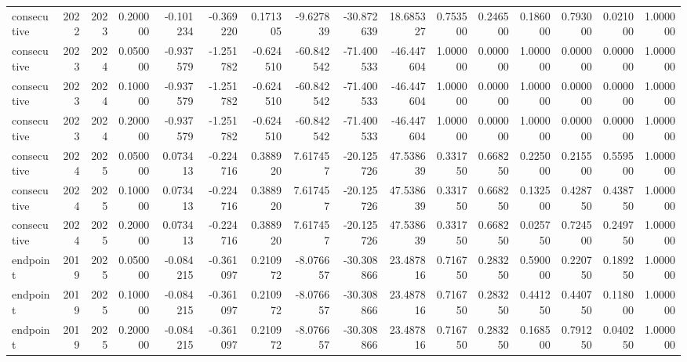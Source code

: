 \begin{tabular}{lrrrrrrrrrrrrrrr}
consecutive & 2022 & 2023 & 0.200000 & -0.101234 & -0.369220 & 0.171305 & -9.627839 & -30.872639 & 18.685327 & 0.753500 & 0.246500 & 0.186000 & 0.793000 & 0.021000 & 1.000000 \\
consecutive & 2023 & 2024 & 0.050000 & -0.937579 & -1.251782 & -0.624510 & -60.842542 & -71.400533 & -46.447604 & 1.000000 & 0.000000 & 1.000000 & 0.000000 & 0.000000 & 1.000000 \\
consecutive & 2023 & 2024 & 0.100000 & -0.937579 & -1.251782 & -0.624510 & -60.842542 & -71.400533 & -46.447604 & 1.000000 & 0.000000 & 1.000000 & 0.000000 & 0.000000 & 1.000000 \\
consecutive & 2023 & 2024 & 0.200000 & -0.937579 & -1.251782 & -0.624510 & -60.842542 & -71.400533 & -46.447604 & 1.000000 & 0.000000 & 1.000000 & 0.000000 & 0.000000 & 1.000000 \\
consecutive & 2024 & 2025 & 0.050000 & 0.073413 & -0.224716 & 0.388920 & 7.617457 & -20.125726 & 47.538639 & 0.331750 & 0.668250 & 0.225000 & 0.215500 & 0.559500 & 1.000000 \\
consecutive & 2024 & 2025 & 0.100000 & 0.073413 & -0.224716 & 0.388920 & 7.617457 & -20.125726 & 47.538639 & 0.331750 & 0.668250 & 0.132500 & 0.428750 & 0.438750 & 1.000000 \\
consecutive & 2024 & 2025 & 0.200000 & 0.073413 & -0.224716 & 0.388920 & 7.617457 & -20.125726 & 47.538639 & 0.331750 & 0.668250 & 0.025750 & 0.724500 & 0.249750 & 1.000000 \\
endpoint & 2019 & 2025 & 0.050000 & -0.084215 & -0.361097 & 0.210972 & -8.076657 & -30.308866 & 23.487816 & 0.716750 & 0.283250 & 0.590000 & 0.220750 & 0.189250 & 1.000000 \\
endpoint & 2019 & 2025 & 0.100000 & -0.084215 & -0.361097 & 0.210972 & -8.076657 & -30.308866 & 23.487816 & 0.716750 & 0.283250 & 0.441250 & 0.440750 & 0.118000 & 1.000000 \\
endpoint & 2019 & 2025 & 0.200000 & -0.084215 & -0.361097 & 0.210972 & -8.076657 & -30.308866 & 23.487816 & 0.716750 & 0.283250 & 0.168500 & 0.791250 & 0.040250 & 1.000000 \\
\bottomrule
\end{tabular}
